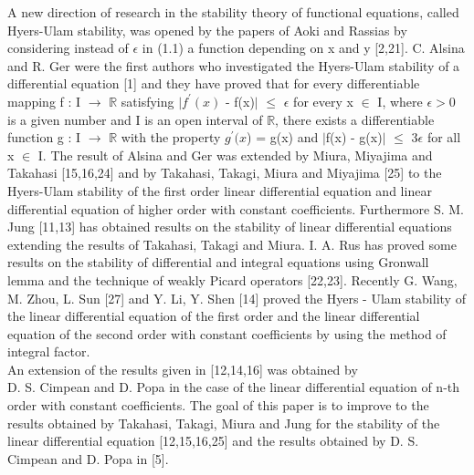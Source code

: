 \documentclass[a4paper,12pt]{report}
\begin{document}
\indent  A new direction of research in the stability theory of functional equations, called Hyers-Ulam stability, was opened by the papers of Aoki and Rassias by considering instead of $\epsilon$ in (1.1) a function \linebreak depending on x and y [2,21]. C. Alsina and R. Ger were the first \linebreak authors who investigated the Hyers-Ulam stability of a differential \linebreak equation [1] and they have proved that for every differentiable \linebreak mapping f : I $\rightarrow$ $\mathbb{R}$ satisfying  $\vert$$f^{\prime}(x)$ - f(x)$\vert$ $\le$ $\epsilon$ for every x $\in$ I, where $\epsilon>0$ is a given number and I is an open interval of $\mathbb{R}$, there exists a \linebreak differentiable function g : I $\rightarrow$ $\mathbb{R}$ with the property $g^{\prime}(x$) = g(x) and $\vert${f(x) - g(x)}$\vert$ $\le$ 3$\epsilon$ for all x $\in$ I. The result of Alsina and Ger was \linebreak extended by Miura, Miyajima and Takahasi [15,16,24] and by \linebreak Takahasi, Takagi, Miura and Miyajima [25] to the Hyers-Ulam  \linebreak stability of the first order linear differential equation and linear  \linebreak differential equation of higher order with constant coefficients.  \linebreak 
\indent Furthermore S. M. Jung [11,13] has obtained results on the \linebreak stability of linear differential equations extending the results of \linebreak Takahasi, Takagi and Miura. I. A. Rus has proved some results on the stability of differential and integral equations using Gronwall lemma and the technique of weakly Picard operators [22,23]. Recently G. Wang, M. Zhou, L. Sun [27] and Y. Li, Y. Shen [14] proved the Hyers - \linebreak Ulam  stability of the linear differential equation of the first order and the linear differential equation of the second order with constant   \linebreak coefficients by using the method of integral factor.\\
\indent An extension of the results given in [12,14,16] was obtained by\\ D. S. Cimpean and D. Popa in the case of the linear differential  \linebreak equation of n-th order with constant coefficients. The goal of this  \linebreak paper is to improve to the results obtained by Takahasi, Takagi, Miura and Jung for the stability of the linear differential equation [12,15,16,25] and the results obtained by D. S. Cimpean and D. Popa in [5].\\
$$
\end{document}
